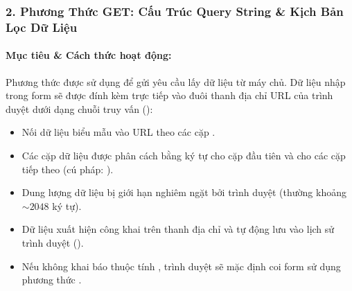 \subsubsection{2. Phương Thức GET: Cấu Trúc Query String \& Kịch Bản Lọc Dữ Liệu}

\paragraph{Mục tiêu \& Cách thức hoạt động:}
Phương thức  được sử dụng để gửi yêu cầu lấy dữ liệu từ máy chủ. Dữ liệu nhập trong form sẽ được đính kèm trực tiếp vào đuôi thanh địa chỉ URL của trình duyệt dưới dạng chuỗi truy vấn ():
\begin{itemize}[leftmargin=1.8em, itemsep=3pt, parsep=0pt]
    \item Nối dữ liệu biểu mẫu vào URL theo các cặp .
    \item Các cặp dữ liệu được phân cách bằng ký tự  cho cặp đầu tiên và \codeinline{\&} cho các cặp tiếp theo (cú pháp: ).
    \item Dung lượng dữ liệu bị giới hạn nghiêm ngặt bởi trình duyệt (thường khoảng $\sim 2048$ ký tự).
    \item Dữ liệu xuất hiện công khai trên thanh địa chỉ và tự động lưu vào lịch sử trình duyệt ().
    \item Nếu không khai báo thuộc tính , trình duyệt sẽ mặc định coi form sử dụng phương thức .
\end{itemize}

